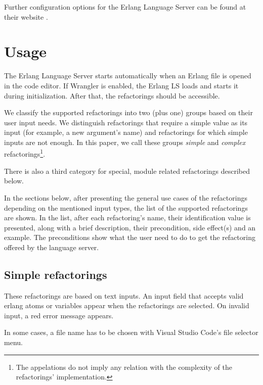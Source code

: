 Further configuration options for the Erlang Language Server can be found at their website \cite{ELSConfig}.

\section{Usage}

The Erlang Language Server starts automatically when an Erlang file is opened in the code editor. If Wrangler is enabled, the Erlang LS loads and starts it during initialization. After that, the refactorings should be accessible.

We classify the supported refactorings into two (plus one) groups based on their user input needs. We distinguish refactorings that require a simple value as its input (for example, a new argument's name) and refactorings for which simple inputs are not enough. In this paper, we call these groups \emph{simple} and \emph{complex} refactorings\footnote{The appelations do not imply any relation with the complexity of the refactorings' implementation.}. 

There is also a third category for special, module related refactorings described below.

In the sections below, after presenting the general use cases of the refactorings depending on the mentioned input types, the list of the supported refactorings are shown. In the list, after each refactoring's name, their identification value is presented, along with a brief description, their precondition, side effect(s) and an example. The preconditions show what the user need to do to get the refactoring offered by the language server.

\subsection{Simple refactorings}

These refactorings are based on text inputs. An input field  that accepts valid erlang atoms or variables appear when the refactorings are selected. On invalid input, a red error message appears.

In some cases, a file name has to be chosen with Visual Studio Code's file selector menu.

